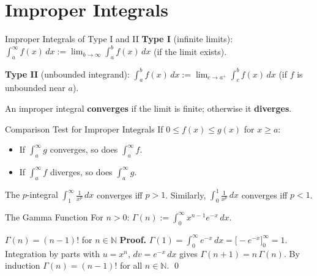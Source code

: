 \documentclass[12pt, openany]{book}
\theoremstyle{plain}
\theoremstyle{definition}
\theoremstyle{remark}
\newcommand{\N}{\mathbb{N}}
\begin{document}
\chapter{Improper Integrals}
\color{black}

\begin{defbox}{Improper Integrals of Type I and II}
\textbf{Type I} (infinite limits):
$\int_a^\infty f(x)\,dx := \lim_{b\to\infty} \int_a^b f(x)\,dx$ (if the limit exists).

\textbf{Type II} (unbounded integrand):
$\int_a^b f(x)\,dx := \lim_{c\to a^+}\int_c^b f(x)\,dx$ (if $f$ is unbounded near $a$).

An improper integral \textbf{converges} if the limit is finite; otherwise it \textbf{diverges}.
\end{defbox}
\color{black}

\begin{thmbox}{Comparison Test for Improper Integrals}
If $0 \leq f(x) \leq g(x)$ for $x \geq a$:
\begin{itemize}[noitemsep]
  \item If $\int_a^\infty g$ converges, so does $\int_a^\infty f$.
  \item If $\int_a^\infty f$ diverges, so does $\int_a^\infty g$.
\end{itemize}
\end{thmbox}
\color{black}

\begin{thmbox}{The $p$-integral}
$\int_1^\infty \frac{1}{x^p}\,dx$ converges iff $p > 1$. Similarly, $\int_0^1 \frac{1}{x^p}\,dx$ converges iff $p < 1$.
\end{thmbox}
\color{black}

\begin{defbox}{The Gamma Function}
For $n > 0$: $\Gamma(n) := \int_0^\infty x^{n-1} e^{-x}\,dx$.
\end{defbox}
\color{black}

\begin{thmbox}{$\Gamma(n) = (n-1)!$ for $n \in \N$}
\textbf{Proof.}
$\Gamma(1) = \int_0^\infty e^{-x}\,dx = \bigl[-e^{-x}\bigr]_0^\infty = 1$.
Integration by parts with $u=x^n$, $dv=e^{-x}\,dx$ gives
$\Gamma(n+1) = n\,\Gamma(n)$.
By induction $\Gamma(n) = (n-1)!$ for all $n \in \N$. \qed
\end{thmbox}
\color{black}
\end{document}
